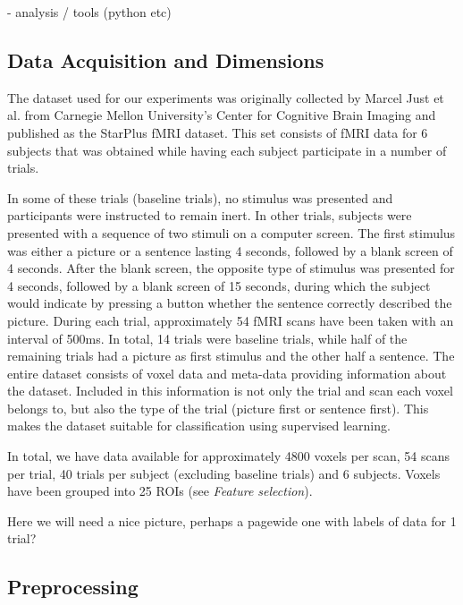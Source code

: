\documentclass[preprint,journal,11pt]{vgtc}
\begin{document}
- analysis / tools (python etc)

\subsection{Data Acquisition and Dimensions}
The dataset used for our experiments was originally collected by Marcel Just et al. from Carnegie Mellon University's Center for Cognitive Brain Imaging and published as the StarPlus fMRI dataset. This set consists of fMRI data for 6 subjects that was obtained while having each subject participate in a number of trials.

In some of these trials (baseline trials), no stimulus was presented and participants were instructed to remain inert. In other trials, subjects were presented with a sequence of two stimuli on a computer screen. The first stimulus was either a picture or a sentence lasting 4 seconds, followed by a blank screen of 4 seconds. After the blank screen, the opposite type of stimulus was presented for 4 seconds, followed by a blank screen of 15 seconds, during which the subject would indicate by pressing a button whether the sentence correctly described the picture. During each trial, approximately 54 fMRI scans have been taken with an interval of 500ms. In total, 14 trials were baseline trials, while half of the remaining trials had a picture as first stimulus and the other half a sentence.  
The entire dataset consists of voxel data and meta-data providing information about the dataset. Included in this information is not only the trial and scan each voxel belongs to, but also the type of the trial (picture first or sentence first). This makes the dataset suitable for classification using supervised learning.

In total, we have data available for approximately 4800 voxels per scan, 54 scans per trial, 40 trials per subject (excluding baseline trials) and 6 subjects. Voxels have been grouped into 25 ROIs (see \textit{Feature selection}).

Here we will need a nice picture, perhaps a pagewide one with labels of data for 1 trial?

\subsection{Preprocessing}
\end{document}
